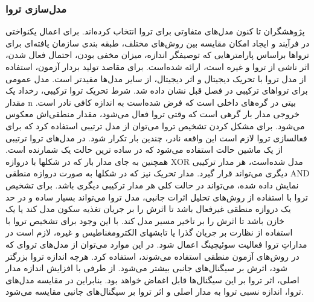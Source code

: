 \subsubsection {مدل‌سازی تروا}
پژوهشگران تا کنون مدل‌های متفاوتی برای تروا انتخاب کرده‌اند. برای اعمال یکنواختی در فرآیند و ایجاد امکان مقایسه بین روش‌های مختلف، طبقه بندی سازمان یافته‌ای برای تروا‌ها براساس پارامترهایی که توصیفگر اندازه، میزان مخفی بودن، احتمال فعال شدن، اثر ناشی از تروا و غیره است، ارائه شده‌است. برای مقاصد تولید بردار آزمون، استفاده از مدل تروا با تحریک دیجیتال و اثر دیجیتال، از سایر مدل‌ها مفیدتر است. 
مدل عمومی برای تروا‌های ترکیبی در فصل قبل نشان داده شد. شرط تحریک تروا ترکیبی، رخداد یک مقدار n بیتی در گره‌های داخلی است که فرض شده‌است به اندازه کافی نادر است. خروجی مدار بار گرهی است که وقتی تروا فعال می‌شود، مقدار منطقی‌اش معکوس می‌شود. برای مشکل کردن تشخیص تروا می‌توان از مدل ترتیبی استفاده کرد که برای فعالسازی تروا لازم است این واقعه نادر، چندین بار تکرار شود. در مدل‌های تروا ترتیبی از یک ماشین حالت استفاده می‌شود که در ساده ترین حالت یک شمارنده است. همچنین به جای مدار بار که در شکلها با دروازه XOR مدل شده‌است، هر مدار ترکیبی دیگری می‌تواند قرار گیرد. مدار تحریک نیز که در شکلها به صورت دروازه منطقی AND نمایش داده شده، می‌تواند در حالت کلی هر مدار ترکیبی دیگری باشد.
برای تشخیص تروا با استفاده از روش‌های تحلیل اثرات جانبی، مدل تروا می‌تواند بسیار ساده و در حد یک دروازه منطقی غیرفعال باشد تا اثرش را بر جریان تغذیه سکون مدل کند یا یک خازن باشد تا اثرش را بر تاخیر مسیر مدل کند. با این وجود برای تشخیص تروا با استفاده از نظارت بر جریان گذرا یا تابشهای الکترومغناطیس و غیره، لازم است در مداراتِ تروا فعالیت سوئیچینگ اعمال شود. در این موارد می‌توان از مدل‌های تروای که در روش‌های آزمون منطقی استفاده می‌شوند، استفاده کرد. هرچه اندازه تروا بزرگتر شود، اثرش بر سیگنال‌های جانبی بیشتر می‌شود. از طرفی با افزایش اندازه مدار اصلی، اثر تروا بر این سیگنال‌ها قابل اغماض خواهد بود. بنابراین در مقایسه مدل‌های تروا، اندازه نسبی تروا به مدار اصلی و اثر تروا بر سیگنال‌های جانبی مقایسه می‌شود. 
